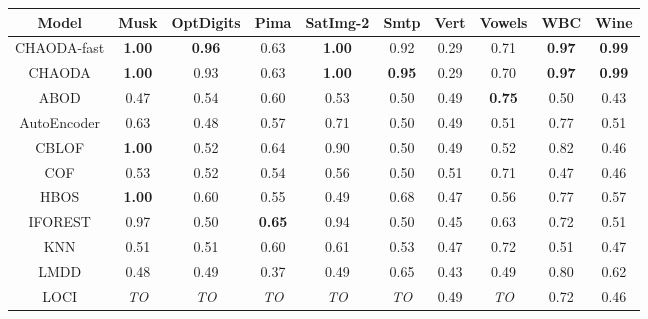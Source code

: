 \begin{table*}[!t]
\begin{center}
\begin{small}
\begin{sc}
\begin{tabular}{|c|c|c|c|c|c|c|c|c|c|}
\hline
\hline
\textbf{Model} & \textbf{Musk} & \textbf{OptDigits} & \textbf{Pima} & \textbf{SatImg-2} & \textbf{Smtp} & \textbf{Vert} & \textbf{Vowels} &  \textbf{WBC} & \textbf{Wine} \\
\hline
        CHAODA-fast & \textbf{1.00} &      \textbf{0.96} &          0.63 &       \textbf{1.00} &          0.92 &               0.29 &            0.71 & \textbf{0.97} & \textbf{0.99} \\
\hline
        CHAODA & \textbf{1.00} &               0.93 &          0.63 &       \textbf{1.00} & \textbf{0.95} &               0.29 &            0.70 & \textbf{0.97} & \textbf{0.99} \\
\hline
        ABOD &          0.47 &               0.54 &          0.60 &                0.53 &          0.50 &               0.49 &   \textbf{0.75} &          0.50 &          0.43 \\
\hline
AutoEncoder &          0.63 &               0.48 &          0.57 &                0.71 &          0.50 &               0.49 &            0.51 &          0.77 &          0.51 \\
\hline
        CBLOF & \textbf{1.00} &               0.52 &          0.64 &                0.90 &          0.50 &               0.49 &            0.52 &          0.82 &          0.46 \\
\hline
        COF &          0.53 &               0.52 &          0.54 &                0.56 &          0.50 &               0.51 &            0.71 &          0.47 &          0.46 \\
\hline
        HBOS & \textbf{1.00} &               0.60 &          0.55 &                0.49 &          0.68 &               0.47 &            0.56 &          0.77 &          0.57 \\
\hline
IFOREST &          0.97 &               0.50 & \textbf{0.65} &                0.94 &          0.50 &               0.45 &            0.63 &          0.72 &          0.51 \\
\hline
        KNN &          0.51 &               0.51 &          0.60 &                0.61 &          0.53 &               0.47 &            0.72 &          0.51 &          0.47 \\
\hline
        LMDD &          0.48 &               0.49 &          0.37 &                0.49 &          0.65 &               0.43 &            0.49 &          0.80 &          0.62 \\
\hline
        LOCI &   \textit{TO} &        \textit{TO} &   \textit{TO} &         \textit{TO} &   \textit{TO} &               0.49 &     \textit{TO} &          0.72 &          0.46 \\

\end{tabular}
\end{sc}
\end{small}
\end{center}
\end{table*}
